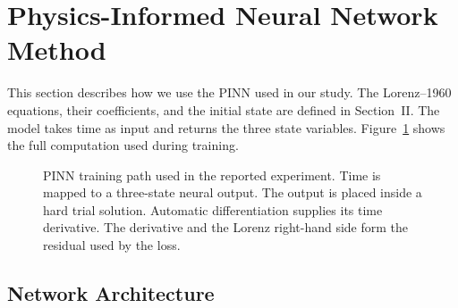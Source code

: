 \section{Physics-Informed Neural Network Method}
\label{sec:pinn-method}

This section describes how we use the PINN used in our study. The Lorenz--1960 equations,
their coefficients, and the initial state are defined in Section~II. The model
takes time as input and returns the three state variables. Figure~\ref{fig:pinn-pipeline}
shows the full computation used during training.

\begin{figure}[htbp]
    \centering
    \caption{PINN training path used in the reported experiment. Time is mapped
    to a three-state neural output. The output is placed inside a hard trial
    solution. Automatic differentiation supplies its time derivative. The
    derivative and the Lorenz right-hand side form the residual used by the loss.}
    \label{fig:pinn-pipeline}
\end{figure}
\FloatBarrier

\subsection{Network Architecture}

